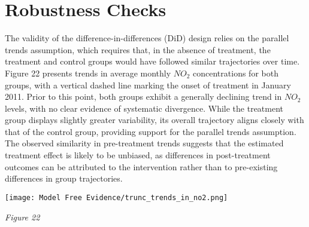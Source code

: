 \documentclass[12pt]{article}
\newenvironment{Figure}
{\par\medskip\noindent\minipage{\linewidth}}
{\endminipage\par\medskip}
\begin{document}
	\clearpage
	\newpage
	
	\section*{Robustness Checks}
	
	\begin{multicols}{2}
		The validity of the difference-in-differences (DiD) design relies on the parallel trends assumption, which requires that, in the absence of treatment, the treatment and control groups would have followed similar trajectories over time. Figure 22 presents trends in average monthly $NO_2$ concentrations for both groups, with a vertical dashed line marking the onset of treatment in January 2011. Prior to this point, both groups exhibit a generally declining trend in $NO_2$ levels, with no clear evidence of systematic divergence. While the treatment group displays slightly greater variability, its overall trajectory aligns closely with that of the control group, providing support for the parallel trends assumption. The observed similarity in pre-treatment trends suggests that the estimated treatment effect is likely to be unbiased, as differences in post-treatment outcomes can be attributed to the intervention rather than to pre-existing differences in group trajectories. 
	\end{multicols}
	
	\begin{Figure}
		\centering
		\texttt{[image: Model Free Evidence/trunc\_trends\_in\_no2.png]}
		
	\end{Figure}
	\begin{center}
		\emph{Figure 22}\\
	\end{center}
	
\end{document}
